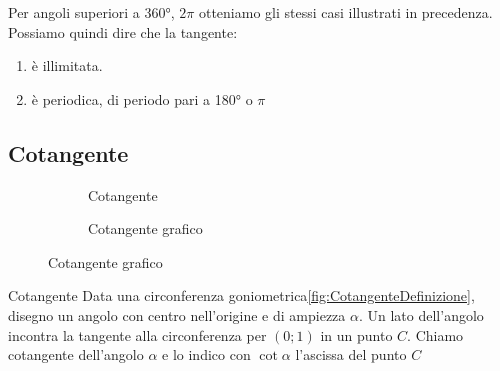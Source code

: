 Per angoli superiori a \ang{360}, $2\pi$ otteniamo gli stessi casi illustrati in precedenza. 
Possiamo quindi dire che la tangente:
\begin{enumerate}
	\item è illimitata.
	\item è periodica, di periodo pari a \ang{180} o $\pi$
\end{enumerate} 
\begin{figure}
	\centering

	\label{fig:AndamentoTangente1}
\end{figure}%
\begin{figure}
	\centering
	
\label{fig:AndamentoTangente2}
\end{figure}%
\subsection{Cotangente}
\label{sec:Cotangente}
\begin{figure}
	\begin{subfigure}[b]{.5\linewidth}
		\centering
		
	\caption{Cotangente}\label{fig:CotangenteDefinizione}
	\end{subfigure}%
	\begin{subfigure}[b]{.5\linewidth}
		\centering
		\caption{Cotangente grafico}\label{fig:CotangenteGrafico}
	\end{subfigure}
	\label{tab:funzcotg}
\end{figure}
%		
\begin{definizionet}{Cotangente}{}
	Data una circonferenza goniometrica\nobs\vref{fig:CotangenteDefinizione}, disegno un angolo con centro nell'origine e di ampiezza $\alpha$. Un lato dell'angolo incontra la tangente  alla circonferenza  per $(0;1)$ in un punto $C$.  Chiamo cotangente dell'angolo $\alpha$ e lo indico con $\cot\alpha$ l'ascissa  del punto $C$
\end{definizionet}
